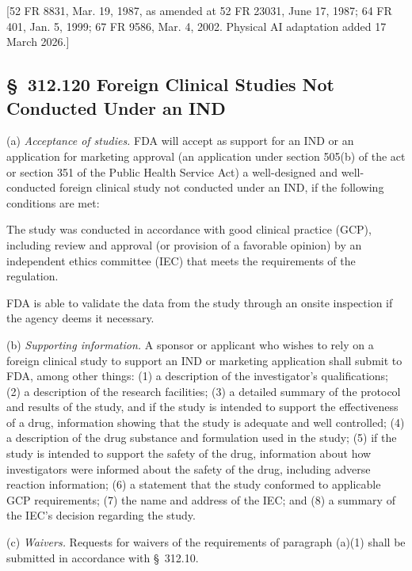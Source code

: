 \documentclass[11pt]{article}
\begin{document}
[52 FR 8831, Mar. 19, 1987, as amended at 52 FR 23031, June 17, 1987; 64 FR 401, Jan. 5, 1999; 67 FR 9586, Mar. 4, 2002. Physical AI adaptation added 17 March 2026.]

\subsection{\S~312.120 Foreign Clinical Studies Not Conducted Under an IND}

(a) \textit{Acceptance of studies.} FDA will accept as support for an IND or an application for marketing approval (an application under section 505(b) of the act or section 351 of the Public Health Service Act) a well-designed and well-conducted foreign clinical study not conducted under an IND, if the following conditions are met:

\begin{description}[leftmargin=0.5cm,style=sameline]
\item[(1)] The study was conducted in accordance with good clinical practice (GCP), including review and approval (or provision of a favorable opinion) by an independent ethics committee (IEC) that meets the requirements of the regulation.
\item[(2)] FDA is able to validate the data from the study through an onsite inspection if the agency deems it necessary.
\end{description}

(b) \textit{Supporting information.} A sponsor or applicant who wishes to rely on a foreign clinical study to support an IND or marketing application shall submit to FDA, among other things: (1) a description of the investigator's qualifications; (2) a description of the research facilities; (3) a detailed summary of the protocol and results of the study, and if the study is intended to support the effectiveness of a drug, information showing that the study is adequate and well controlled; (4) a description of the drug substance and formulation used in the study; (5) if the study is intended to support the safety of the drug, information about how investigators were informed about the safety of the drug, including adverse reaction information; (6) a statement that the study conformed to applicable GCP requirements; (7) the name and address of the IEC; and (8) a summary of the IEC's decision regarding the study.

(c) \textit{Waivers.} Requests for waivers of the requirements of paragraph (a)(1) shall be submitted in accordance with \S~312.10.
\end{document}

